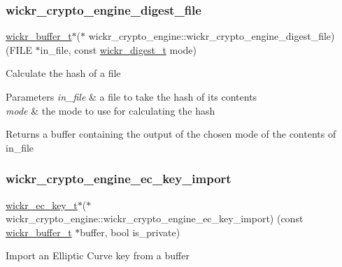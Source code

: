 \subsubsection{\texorpdfstring{wickr\+\_\+crypto\+\_\+engine\+\_\+digest\+\_\+file}{wickr\_crypto\_engine\_digest\_file}}
{\footnotesize\ttfamily \mbox{\hyperlink{structwickr__buffer}{wickr\+\_\+buffer\+\_\+t}}$\ast$($\ast$ wickr\+\_\+crypto\+\_\+engine\+::wickr\+\_\+crypto\+\_\+engine\+\_\+digest\+\_\+file) (F\+I\+LE $\ast$in\+\_\+file, const \mbox{\hyperlink{structwickr__digest}{wickr\+\_\+digest\+\_\+t}} mode)}

Calculate the hash of a file


\begin{DoxyParams}{Parameters}
{\em in\+\_\+file} & a file to take the hash of it\textquotesingle{}s contents \\
\hline
{\em mode} & the mode to use for calculating the hash \\
\hline
\end{DoxyParams}
\begin{DoxyReturn}{Returns}
a buffer containing the output of the chosen mode of the contents of in\+\_\+file 
\end{DoxyReturn}
\mbox{\label{group__wickr__crypto__engine_ga87a069bbd3cdf509946e4ca0ca008f8f}} 
\subsubsection{\texorpdfstring{wickr\+\_\+crypto\+\_\+engine\+\_\+ec\+\_\+key\+\_\+import}{wickr\_crypto\_engine\_ec\_key\_import}}
{\footnotesize\ttfamily \mbox{\hyperlink{structwickr__ec__key}{wickr\+\_\+ec\+\_\+key\+\_\+t}}$\ast$($\ast$ wickr\+\_\+crypto\+\_\+engine\+::wickr\+\_\+crypto\+\_\+engine\+\_\+ec\+\_\+key\+\_\+import) (const \mbox{\hyperlink{structwickr__buffer}{wickr\+\_\+buffer\+\_\+t}} $\ast$buffer, bool is\+\_\+private)}

Import an Elliptic Curve key from a buffer


